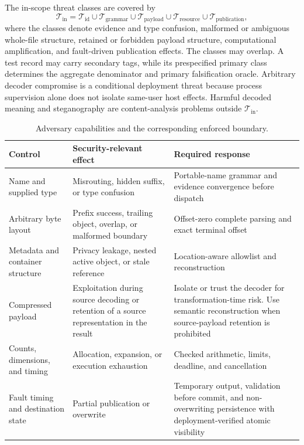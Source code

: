The in-scope threat classes are covered by
\begin{equation}
  \mathcal{T}_{\mathrm{in}}=
  \mathcal{T}_{\mathrm{id}}\cup
  \mathcal{T}_{\mathrm{grammar}}\cup
  \mathcal{T}_{\mathrm{payload}}\cup
  \mathcal{T}_{\mathrm{resource}}\cup
  \mathcal{T}_{\mathrm{publication}},
  \label{eq:threat-cover}
\end{equation}
where the classes denote evidence and type confusion, malformed or ambiguous
whole-file structure, retained or forbidden payload structure, computational
amplification, and fault-driven publication effects. The classes may overlap.
A test record may carry secondary tags, while its prespecified primary class
determines the aggregate denominator and primary falsification oracle.
Arbitrary decoder compromise is a conditional deployment threat because process
supervision alone does not isolate same-user host effects. Harmful decoded
meaning and steganography are content-analysis problems outside
\(\mathcal{T}_{\mathrm{in}}\).

\begin{table}[t]
\centering
\caption{Adversary capabilities and the corresponding enforced boundary.}
\label{tab:adversary-capabilities}
\small
\begin{tabularx}{\textwidth}{L{0.23\textwidth}YY}
\toprule
Control & Security-relevant effect & Required response \\
\midrule
Name and supplied type & Misrouting, hidden suffix, or type confusion & Portable-name grammar and evidence convergence before dispatch \\
Arbitrary byte layout & Prefix success, trailing object, overlap, or malformed boundary & Offset-zero complete parsing and exact terminal offset \\
Metadata and container structure & Privacy leakage, nested active object, or stale reference & Location-aware allowlist and reconstruction \\
Compressed payload & Exploitation during source decoding or retention of a source representation in the result & Isolate or trust the decoder for transformation-time risk. Use semantic reconstruction when source-payload retention is prohibited \\
Counts, dimensions, and timing & Allocation, expansion, or execution exhaustion & Checked arithmetic, limits, deadline, and cancellation \\
Fault timing and destination state & Partial publication or overwrite & Temporary output, validation before commit, and non-overwriting persistence with deployment-verified atomic visibility \\
\bottomrule
\end{tabularx}
\end{table}

